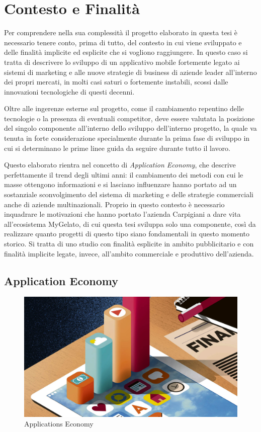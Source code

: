 \section{Contesto e Finalità}
Per comprendere nella sua complessità il progetto elaborato in questa tesi è necessario tenere conto, prima di tutto, del contesto in cui viene sviluppato e delle finalità implicite ed esplicite che si vogliono raggiungere.
In questo caso si tratta di descrivere lo sviluppo di un applicativo mobile fortemente legato ai sistemi di marketing e alle nuove strategie di business di aziende leader all'interno dei propri mercati, in molti casi saturi o fortemente instabili, scossi dalle innovazioni tecnologiche di questi decenni.

Oltre alle ingerenze esterne sul progetto, come il cambiamento repentino delle tecnologie o la presenza di eventuali competitor, deve essere valutata la posizione del singolo componente all'interno dello sviluppo dell'interno progetto, la quale va tenuta in forte considerazione specialmente durante la prima fase di sviluppo in cui si determinano le prime linee guida da seguire durante tutto il lavoro.

Questo elaborato rientra nel concetto di \textit{Application Economy}, che descrive perfettamente il trend degli ultimi anni: il cambiamento dei metodi con cui le masse ottengono informazioni e si lasciano influenzare hanno portato ad un sostanziale sconvolgimento del sistema di marketing e delle strategie commerciali anche di aziende multinazionali. 
Proprio in questo contesto è necessario inquadrare le motivazioni che hanno portato l'azienda Carpigiani a dare vita all'ecosistema MyGelato, di cui questa tesi sviluppa solo una componente, così da realizzare quanto progetti di questo tipo siano fondamentali in questo momento storico.
Si tratta di uno studio con finalità esplicite in ambito pubblicitario e con finalità implicite legate, invece, all'ambito commerciale e produttivo dell'azienda.


\subsection{Application Economy}
  
\begin{figure}[h!]
  \includegraphics[width=\linewidth]{images/The-App-Economy.jpg}
  \caption{Applications Economy}
  \label{fig:appEconomy1}
\end{figure}
  

